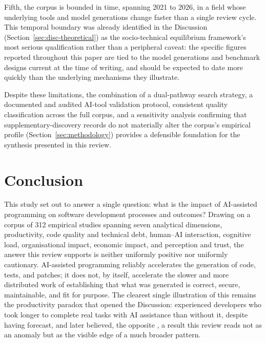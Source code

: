Fifth, the corpus is bounded in time, spanning 2021 to 2026, in a field whose underlying tools and model generations change faster than a single review cycle. This temporal boundary was already identified in the Discussion (Section~\ref{sec:disc-theoretical}) as the socio-technical equilibrium framework's most serious qualification rather than a peripheral caveat: the specific figures reported throughout this paper are tied to the model generations and benchmark designs current at the time of writing, and should be expected to date more quickly than the underlying mechanisms they illustrate.

Despite these limitations, the combination of a dual-pathway search strategy, a documented and audited AI-tool validation protocol, consistent quality classification across the full corpus, and a sensitivity analysis confirming that supplementary-discovery records do not materially alter the corpus's empirical profile (Section~\ref{sec:methodology}) provides a defensible foundation for the synthesis presented in this review.

\section{Conclusion}
\label{conclusion}

This study set out to answer a single question: what is the impact of AI-assisted programming on software development processes and outcomes? Drawing on a corpus of 312 empirical studies spanning seven analytical dimensions, productivity, code quality and technical debt, human--AI interaction, cognitive load, organisational impact, economic impact, and perception and trust, the answer this review supports is neither uniformly positive nor uniformly cautionary. AI-assisted programming reliably accelerates the generation of code, tests, and patches; it does not, by itself, accelerate the slower and more distributed work of establishing that what was generated is correct, secure, maintainable, and fit for purpose. The clearest single illustration of this remains the productivity paradox that opened the Discussion: experienced developers who took longer to complete real tasks with AI assistance than without it, despite having forecast, and later believed, the opposite \cite{becker_measuring_2025}, a result this review reads not as an anomaly but as the visible edge of a much broader pattern.

